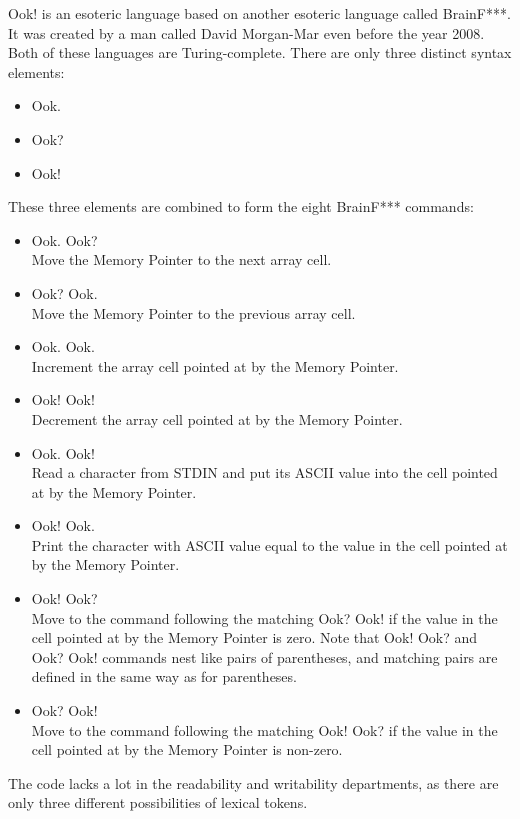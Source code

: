 \documentclass[a4paper]{article}
\begin{document}
	Ook! is an esoteric language based on another esoteric language called BrainF***. It was created by a man called David Morgan-Mar even before the year 2008. Both of these languages are Turing-complete\cite{ook2}. There are only three distinct syntax elements:
	\begin{itemize}
	\item Ook.
	\item Ook?
	\item Ook!
	\end{itemize}
	These three elements are combined to form the eight BrainF*** commands: \cite{ook}
\begin{itemize}

    \item Ook. Ook?\\
    Move the Memory Pointer to the next array cell.
    \item Ook? Ook.\\
    Move the Memory Pointer to the previous array cell.
    \item Ook. Ook.\\
    Increment the array cell pointed at by the Memory Pointer.
    \item Ook! Ook!\\
    Decrement the array cell pointed at by the Memory Pointer.
    \item Ook. Ook!\\
    Read a character from STDIN and put its ASCII value into the cell pointed at by the Memory Pointer.
    \item Ook! Ook.\\
    Print the character with ASCII value equal to the value in the cell pointed at by the Memory Pointer.
    \item Ook! Ook?\\
    Move to the command following the matching Ook? Ook! if the value in the cell pointed at by the Memory Pointer is zero. Note that Ook! Ook? and Ook? Ook! commands nest like pairs of parentheses, and matching pairs are defined in the same way as for parentheses.
    \item Ook? Ook!\\
    Move to the command following the matching Ook! Ook? if the value in the cell pointed at by the Memory Pointer is non-zero. 
\end{itemize}	
	The code lacks a lot in the readability and writability departments, as there are only three different possibilities of lexical tokens.
\end{document}
